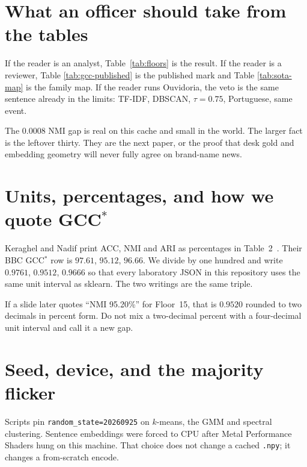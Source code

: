 \documentclass[11pt,a4paper]{article}
\begin{document}
\section{What an officer should take from the tables}

If the reader is an analyst, Table~\ref{tab:floors} is the
result. If the reader is a reviewer, Table
\ref{tab:gcc-published} is the published mark and Table
\ref{tab:sota-map} is the family map. If the reader runs
Ouvidoria, the veto is the same sentence already in the
limits: TF-IDF, DBSCAN, $\tau=0.75$, Portuguese, same
event.

The $0.0008$ NMI gap is real on this cache and small in the
world. The larger fact is the leftover thirty. They are the
next paper, or the proof that desk gold and embedding
geometry will never fully agree on brand-name news.

\section{Units, percentages, and how we quote GCC$^*$}

Keraghel and Nadif print ACC, NMI and ARI as percentages in
Table~2~\cite{keraghel2024gcc}. Their BBC GCC$^*$ row is
$97.61$, $95.12$, $96.66$. We divide by one hundred and
write $0.9761$, $0.9512$, $0.9666$ so that every laboratory
JSON in this repository uses the same unit interval as
sklearn. The two writings are the same triple.

If a slide later quotes ``NMI 95.20\%'' for Floor~15, that
is $0.9520$ rounded to two decimals in percent form. Do not
mix a two-decimal percent with a four-decimal unit interval
and call it a new gap.

\section{Seed, device, and the majority flicker}

Scripts pin \texttt{random\_state=20260925} on $k$-means,
the GMM and spectral clustering. Sentence embeddings were
forced to CPU after Metal Performance Shaders hung on this
machine. That choice does not change a cached
\texttt{.npy}; it changes a from-scratch encode.
\end{document}
